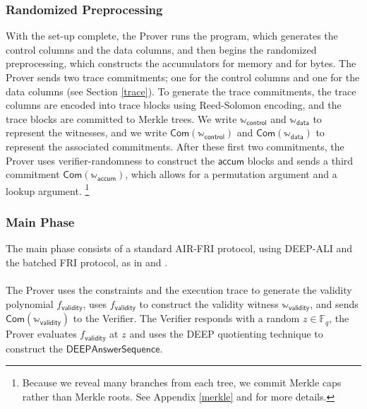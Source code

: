 \documentclass[10pt,letterpaper,titlepage]{article}
\newcommand{\GF}[1]{\mathbb{F}_{#1}}
\theoremstyle{definition}
\begin{document}
\subsubsection{Randomized Preprocessing}
With the set-up complete, the Prover runs the program, which generates the control columns and the data columns, and then begins the randomized preprocessing, which constructs the accumulators for memory and for bytes. 
The Prover sends two trace commitments; one for the control columns and one for the data columns (see Section \ref{trace}). 
To generate the trace commitments, the trace columns are encoded into trace blocks using Reed-Solomon encoding, and the trace blocks are committed to Merkle trees. 
We write $\mathbb{w}_\mathsf{control}$ and $\mathbb{w}_\mathsf{data}$ to represent the witnesses, 
and we write $\mathsf{Com}(\mathbb{w}_\mathsf{control})$ and $\mathsf{Com}(\mathbb{w}_\mathsf{data})$ to represent the associated commitments.
After these first two commitments, the Prover uses verifier-randomness to construct the $\mathsf{accum}$ blocks and sends a third commitment $\mathsf{Com}(\mathbb{w}_\mathsf{accum})$, which allows for a permutation argument and a lookup argument.%
%
\footnote{Because we reveal many branches from each tree, we commit Merkle caps rather than Merkle roots. 
See Appendix \ref{merkle} and \cite{merklecap} for more details.} 

\subsubsection{Main Phase}
The main phase consists of a standard AIR-FRI protocol, using DEEP-ALI\cite{deepFRI} and the batched FRI protocol\cite{proxGaps}, as in \cite{ethSTARK} and \cite{plonky2}.\\
\\
The Prover uses the constraints and the execution trace to generate the validity polynomial $f_\mathsf{validity}$, 
uses $f_\mathsf{validity}$ to construct the validity witness $\mathbb{w}_\mathsf{validity}$,
and sends $\mathsf{Com}(\mathbb{w}_\mathsf{validity})$ to the Verifier.  
The Verifier responds with a random $z\in\GF{q}$, 
the Prover evaluates $f_\mathsf{validity}$ at $z$ and uses the DEEP quotienting technique to construct the $\mathsf{DEEPAnswerSequence}.$
\end{document}
